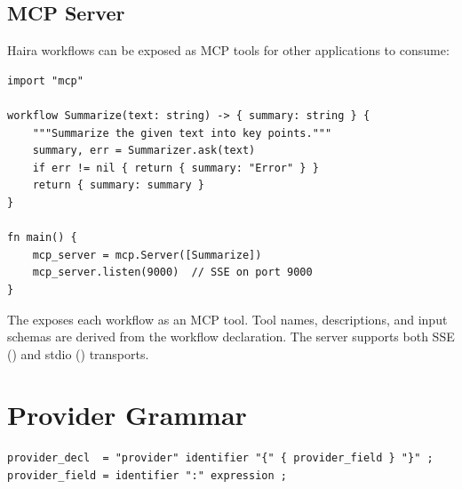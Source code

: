 \subsection{MCP Server}

Haira workflows can be exposed as MCP tools for other applications to consume:

\begin{lstlisting}
import "mcp"

workflow Summarize(text: string) -> { summary: string } {
    """Summarize the given text into key points."""
    summary, err = Summarizer.ask(text)
    if err != nil { return { summary: "Error" } }
    return { summary: summary }
}

fn main() {
    mcp_server = mcp.Server([Summarize])
    mcp_server.listen(9000)  // SSE on port 9000
}
\end{lstlisting}

The  exposes each workflow as an MCP tool. Tool names, descriptions, and input schemas are derived from the workflow declaration. The server supports both SSE () and stdio () transports.

\section{Provider Grammar}

\begin{lstlisting}[language=EBNF]
provider_decl  = "provider" identifier "{" { provider_field } "}" ;
provider_field = identifier ":" expression ;
\end{lstlisting}
